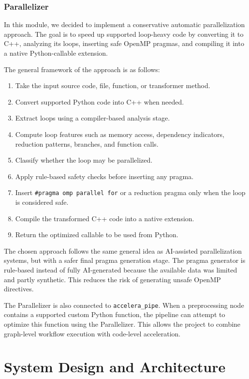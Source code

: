 \documentclass[12pt,a4paper]{report}
\begin{document}
\subsection{Parallelizer}
In this module, we decided to implement a conservative automatic parallelization
approach. The goal is to speed up supported loop-heavy code by converting it to
C++, analyzing its loops, inserting safe OpenMP pragmas, and compiling it into a
native Python-callable extension.

The general framework of the approach is as follows:
\begin{enumerate}
  \item Take the input source code, file, function, or transformer method.
  \item Convert supported Python code into C++ when needed.
  \item Extract loops using a compiler-based analysis stage.
  \item Compute loop features such as memory access, dependency indicators,
  reduction patterns, branches, and function calls.
  \item Classify whether the loop may be parallelized.
  \item Apply rule-based safety checks before inserting any pragma.
  \item Insert \texttt{\#pragma omp parallel for} or a reduction pragma only
  when the loop is considered safe.
  \item Compile the transformed C++ code into a native extension.
  \item Return the optimized callable to be used from Python.
\end{enumerate}

\noindent The chosen approach follows the same general idea as AI-assisted
parallelization systems, but with a safer final pragma generation stage. The
pragma generator is rule-based instead of fully AI-generated because the
available data was limited and partly synthetic. This reduces the risk of
generating unsafe OpenMP directives.

\noindent The Parallelizer is also connected to \texttt{accelera\_pipe}. When a
preprocessing node contains a supported custom Python function, the pipeline can
attempt to optimize this function using the Parallelizer. This allows the
project to combine graph-level workflow execution with code-level acceleration.


\chapter{System Design and Architecture}
\end{document}
